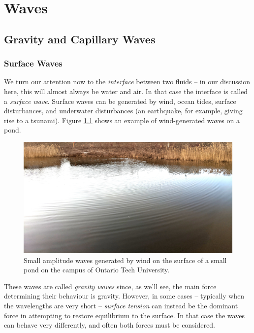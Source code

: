 \chapter{Waves}

%
%

\section{Gravity and Capillary Waves}



\subsection{Surface Waves}

We turn our attention now to the \emph{interface} between two fluids -- in our discussion here, this will almost always be water and air.  In that case the interface is called a \emph{surface wave}.  Surface waves can be generated by wind, ocean tides, surface disturbances, and underwater disturbances (an earthquake, for example, giving rise to a tsunami).  Figure \ref{fig_pond} shows an example of wind-generated waves on a pond.  

\begin{figure}
\centering\includegraphics[width=0.9\linewidth]{Figures/Chapter5/fig_pond_waves}
\caption{Small amplitude waves generated by wind on the surface of a small pond on the campus of Ontario Tech University.}
\label{fig_pond}
\end{figure}

These waves are called \emph{gravity waves} since, as we'll see, the main force determining their behaviour is gravity.  However, in some cases -- typically when the wavelengths are very short -- \emph{surface tension} can instead be the dominant force in attempting to restore equilibrium to the surface.  In that case the waves can behave very differently, and often both forces must be considered.

